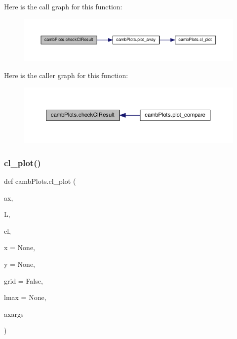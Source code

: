 Here is the call graph for this function\+:
\nopagebreak
\begin{figure}[H]
\begin{center}
\leavevmode
\includegraphics[width=350pt]{namespacecambPlots_a92f653f492e72e931e693f9e0e0a4c6a_cgraph}
\end{center}
\end{figure}
Here is the caller graph for this function\+:
\nopagebreak
\begin{figure}[H]
\begin{center}
\leavevmode
\includegraphics[width=350pt]{namespacecambPlots_a92f653f492e72e931e693f9e0e0a4c6a_icgraph}
\end{center}
\end{figure}
\mbox{\label{namespacecambPlots_acbf66894e403d2b8926fa5a598fb204d}} 
\subsubsection{\texorpdfstring{cl\+\_\+plot()}{cl\_plot()}}
{\footnotesize\ttfamily def camb\+Plots.\+cl\+\_\+plot (\begin{DoxyParamCaption}\item[{}]{ax,  }\item[{}]{L,  }\item[{}]{cl,  }\item[{}]{x = {\ttfamily None},  }\item[{}]{y = {\ttfamily None},  }\item[{}]{grid = {\ttfamily False},  }\item[{}]{lmax = {\ttfamily None},  }\item[{}]{axargs }\end{DoxyParamCaption})}



